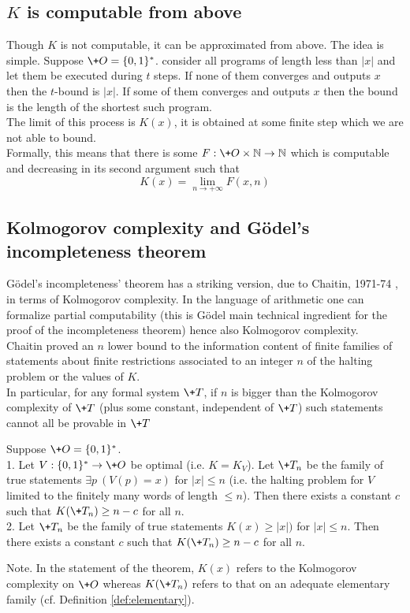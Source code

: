 \subsection{$K$ is computable from above}\label{ss:Kabove}
Though $K$ is not computable, it can be approximated from above.
The idea is simple. Suppose $\+O={\{0,1\}^*}$.
consider all programs of length less than $|x|$ and let them be
executed during $t$ steps.
If none of them converges and outputs $x$
then the $t$-bound is $|x|$.
If some of them converges and outputs $x$
then the bound is the length of the shortest such program.
\\
The limit of this process is $K(x)$, it is obtained at some
finite step which we are not able to bound.
\\
Formally, this means that there is some $F:\+O\times{\mathbb N}\to{\mathbb N}$
which is computable and decreasing in its second argument
such that
$$
K(x) = \lim_{n\to+\infty} F(x,n)
$$
\subsection{Kolmogorov complexity
            and G\"odel's incompleteness theorem}\label{ss:godel}
G\"odel's incompleteness' theorem has a striking version,
due to Chaitin, 1971-74 \cite{chaitin71, chaitin74},
in terms of Kolmogorov complexity.
In the language of arithmetic one can formalize partial
computability (this is G\"odel main technical ingredient
for the proof of the incompleteness theorem) hence also
Kolmogorov complexity.
\\
Chaitin proved an $n$ lower bound to the information content
of finite families of statements about finite restrictions
associated to an integer $n$ of the halting problem
or the values of $K$.
\\
In particular, for any formal system $\+T$, if $n$ is bigger
than the Kolmogorov complexity of $\+T$
(plus some constant, independent of $\+T$)
such statements cannot all be provable in $\+T$
\begin{theorem}
Suppose $\+O={\{0,1\}^*}$.
\\
1. Let $V:{\{0,1\}^*}\to\+O$ be optimal (i.e. $K=K_V$).
Let $\+T_n$ be the family of true statements
$\exists p\ (V(p)=x)$ for $|x|\leq n$
(i.e. the halting problem for $V$ limited to the finitely
many words of length $\leq n$).
Then there exists a constant $c$ such that
$K(\+T_n) \geq n-c$ for all $n$.
\medskip\\
2. Let $\+T_n$ be the family of true statements
$K(x)\geq|x|)$ for $|x|\leq n$.
Then there exists a constant $c$ such that
$K(\+T_n) \geq n-c$ for all $n$.
\end{theorem}
\noindent
Note. In the statement of the theorem, $K(x)$ refers to
the Kolmogorov complexity on $\+O$ whereas $K(\+T_n)$
refers to that on an adequate elementary family
(cf. Definition \ref{def:elementary}).
